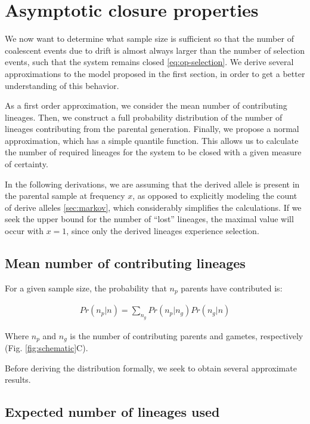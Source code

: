 \documentclass[review]{elsarticle}
\begin{document}
\section{Asymptotic closure properties}

We now want to determine what sample size is sufficient so that the number of coalescent events due
to drift is almost always larger than the number of selection events, such that the system remains
closed \eqref{eq:op-selection}. We derive several approximations to the model proposed in the first
section, in order to get a better understanding of this behavior.

As a first order approximation, we consider the mean number of contributing lineages. Then, we
construct a full probability distribution of the number of lineages contributing from the parental
generation. Finally, we propose a normal approximation, which has a simple quantile
function. This allows us to calculate the number of required lineages for the system to be closed
with a given measure of certainty.

In the following derivations, we are assuming that the derived allele is present in the parental
sample at frequency $x$, as opposed to explicitly modeling the count of derive alleles
\ref{sec:markov}, which considerably simplifies the calculations. If we seek the upper bound for the
number of ``lost'' lineages, the maximal value will occur with $x=1$, since only the derived
lineages experience selection.

\subsection{Mean number of contributing lineages}
\label{sec:mean-contr}

For a given sample size, the probability that $n_p$ parents have contributed is:

\begin{align}
  \label{eq:conditional}
  Pr(n_p | n) = \sum_{n_g} Pr(n_p | n_g)Pr(n_g | n)
\end{align}

Where $n_p$ and $n_g$ is the number of contributing parents and gametes, respectively (Fig.
\ref{fig:schematic}C).

Before deriving the distribution formally, we seek to obtain several approximate results.

\subsection{Expected number of lineages used}
\label{subsec:exp-number}
\end{document}
